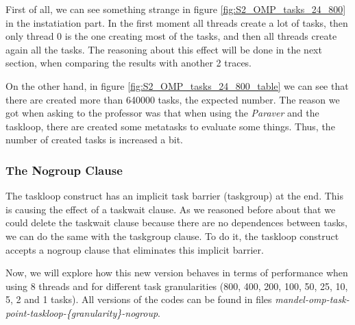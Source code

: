 \documentclass[12pt, a4paper]{article}
\begin{document}
First of all, we can see something strange in figure \ref{fig:S2_OMP_tasks_24_800} in the instatiation part. In the first moment all threads create a lot of tasks, then only thread 0 is the one creating most of the tasks, and then all threads create again all the tasks. The reasoning about this effect will be done in the next section, when comparing the results with another 2 traces.

On the other hand, in figure \ref{fig:S2_OMP_tasks_24_800_table} we can see that there are created more than 640000 tasks, the expected number. The reason we got when asking to the professor was that when using the \textit{Paraver} and the taskloop, there are created some metatasks to evaluate some things. Thus, the number of created tasks is increased a bit.

\subsubsection{The Nogroup Clause}

The taskloop construct has an implicit task barrier (taskgroup) at the end. This is causing the effect of a taskwait clause. As we reasoned before about that we could delete the taskwait clause because there are no dependences between tasks, we can do the same with the taskgroup clause. To do it, the taskloop construct accepts a nogroup clause that eliminates this implicit barrier.

Now, we will explore how this new version behaves in terms of performance when using 8 threads and for different task granularities (800, 400, 200, 100, 50, 25, 10, 5, 2 and 1 tasks). All versions of the codes can be found in files \textit{mandel-omp-task-point-taskloop-\{granularity\}-nogroup}.
\end{document}
